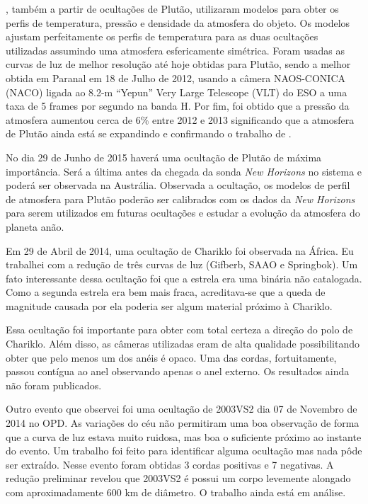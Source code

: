 \documentclass[12pt,a4paper]{monografia}
\begin{document}
\cite{DiasOliveira2015}, também a partir de ocultações de Plutão, utilizaram modelos para obter os perfis de temperatura, pressão e densidade da atmosfera do objeto. Os modelos ajustam perfeitamente os perfis de temperatura para as duas ocultações utilizadas assumindo uma atmosfera esfericamente simétrica. Foram usadas as curvas de luz de melhor resolução até hoje obtidas para Plutão, sendo a melhor obtida em  Paranal em 18 de Julho de 2012, usando a câmera NAOS-CONICA (NACO) ligada ao 8.2-m “Yepun” Very Large Telescope (VLT) do ESO a uma taxa de 5 frames por segundo na banda H. Por fim, foi obtido que a pressão da atmosfera aumentou cerca de 6\% entre 2012 e 2013 significando que a atmosfera de Plutão ainda está se expandindo e confirmando o trabalho de \cite{Olkin2015}.

No dia 29 de Junho de 2015 haverá uma ocultação de Plutão de máxima importância. Será a última antes da chegada da sonda \textit{New Horizons} no sistema e poderá ser observada na Austrália. Observada a ocultação, os modelos de perfil de atmosfera para Plutão poderão ser calibrados com os dados da \textit{New Horizons} para serem utilizados em futuras ocultações e estudar a evolução da atmosfera do planeta anão.

Em 29 de Abril de 2014, uma ocultação de Chariklo foi observada na África. Eu trabalhei com a redução de três curvas de luz (Gifberb, SAAO e Springbok). Um fato interessante dessa ocultação foi que a estrela era uma binária não catalogada. Como a segunda estrela era bem mais fraca, acreditava-se que a queda de magnitude causada por ela poderia ser algum material próximo à Chariklo.

Essa ocultação foi importante para obter com total certeza a direção do polo de Chariklo. Além disso, as câmeras utilizadas eram de alta qualidade possibilitando obter que pelo menos um dos anéis é opaco. Uma das cordas, fortuitamente, passou contígua ao anel observando apenas o anel externo. Os resultados ainda não foram publicados.

Outro evento que observei foi uma ocultação de 2003VS2 dia 07 de Novembro de 2014 no OPD. As variações do céu não permitiram uma boa observação de forma que a curva de luz estava muito ruidosa, mas boa o suficiente próximo ao instante do evento. Um trabalho foi feito para identificar alguma ocultação mas nada pôde ser extraído. Nesse evento foram obtidas 3 cordas positivas e 7 negativas. A redução preliminar revelou que 2003VS2 é possui um corpo levemente alongado com aproximadamente 600 km de diâmetro. O trabalho ainda está em análise.
\end{document}
